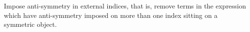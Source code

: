 
Impose anti-symmetry in
external indices, that is, remove terms in the expression which have
anti-symmetry imposed on more than one index sitting on a symmetric
object.
